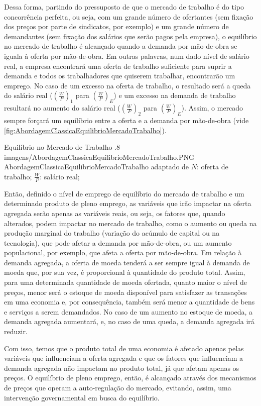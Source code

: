 Dessa forma, partindo do pressuposto de que o mercado de trabalho é do tipo concorrência perfeita, ou seja, com um grande número de ofertantes (sem fixação dos preços por parte de sindicatos, por exemplo) e um grande número de demandantes (sem fixação dos salários que serão pagos pela empresa), o equilíbrio no mercado de trabalho é alcançado quando a demanda por mão-de-obra se iguala à oferta por mão-de-obra. Em outras palavras, num dado nível de salário real, a empresa encontrará uma oferta de trabalho suficiente para suprir a demanda e todos os trabalhadores que quiserem trabalhar, encontrarão um emprego. No caso de um excesso na oferta de trabalho, o resultado será a queda do salário real ($\left(\frac{W}{P}\right)_{1}$ para $\left(\frac{W}{P}\right)_{E}$) e um excesso na demanda de trabalho resultará no aumento do salário real ($\left(\frac{W}{P}\right)_{2}$ para $\left(\frac{W}{P}\right)_{E}$). Assim, o mercado sempre forçará um equilíbrio entre a oferta e a demanda por mão-de-obra (vide \autoref{fig:AbordagemClassicaEquilibrioMercadoTrabalho}).

\figuracomnota
	{Equilíbrio no Mercado de Trabalho}
	{.8}
	{imagens/AbordagemClassicaEquilibrioMercadoTrabalho.PNG}
	{AbordagemClassicaEquilibrioMercadoTrabalho}
	{adaptado de \citet[p.113]{vasconcellos2015}}
	{$N$: oferta de trabalho; $\frac{W}{P}$: salário real;}

Então, definido o nível de emprego de equilíbrio do mercado de trabalho e um determinado produto de pleno emprego, as variáveis que irão impactar na oferta agregada serão apenas as variáveis reais, ou seja, os fatores que, quando alterados, podem impactar no mercado de trabalho, como o aumento ou queda na produção marginal do trabalho (variação do acúmulo de capital ou na tecnologia), que pode afetar a demanda por mão-de-obra, ou um aumento populacional, por exemplo, que afeta a oferta por mão-de-obra. Em relação à demanda agregada, a oferta de moeda tenderá a ser sempre igual à demanda de moeda que, por sua vez, é proporcional à quantidade do produto total. Assim, para uma determinada quantidade de moeda ofertada, quanto maior o nível de preços, menor será o estoque de moeda disponível para satisfazer as transações em uma economia e, por consequência, também será menor a quantidade de bens e serviços a serem demandados. No caso de um aumento no estoque de moeda, a demanda agregada aumentará, e, no caso de uma queda, a demanda agregada irá reduzir.

Com isso, temos que o produto total de uma economia é afetado apenas pelas variáveis que influenciam a oferta agregada e que os fatores que influenciam a demanda agregada não impactam no produto total, já que afetam apenas os preços. O equilíbrio de pleno emprego, então, é alcançado através dos mecanismos de preços que operam a auto-regulação do mercado, evitando, assim, uma intervenção governamental em busca do equilíbrio.

